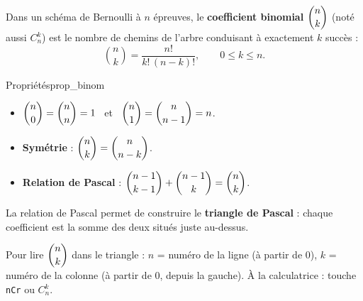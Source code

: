\begin{definition}
	Dans un schéma de Bernoulli à $n$ épreuves, le \textbf{coefficient
	binomial} $\dbinom{n}{k}$ (noté aussi $C_n^k$) est le nombre de chemins de
	l'arbre conduisant à exactement $k$ succès :
	\[
	\binom{n}{k} = \frac{n!}{k!\,(n-k)!}, \qquad 0\leqslant k\leqslant n.
	\]
\end{definition}

\begin{propriete}{Propriétés}{prop_binom}
	\begin{itemize}[label=\textbullet]
		\item $\dbinom{n}{0} = \dbinom{n}{n} = 1$ \ et \
		$\dbinom{n}{1} = \dbinom{n}{n-1} = n$.
		\item \textbf{Symétrie} : $\dbinom{n}{k} = \dbinom{n}{n-k}$.
		\item \textbf{Relation de Pascal} :
		$\dbinom{n-1}{k-1} + \dbinom{n-1}{k} = \dbinom{n}{k}$.
	\end{itemize}
\end{propriete}

La relation de Pascal permet de construire le \textbf{triangle de Pascal} :
chaque coefficient est la somme des deux situés juste au-dessus.

\begin{center}
\end{center}

\begin{astucebac}
	Pour lire $\dbinom{n}{k}$ dans le triangle : $n$ = numéro de la ligne
	(à partir de $0$), $k$ = numéro de la colonne (à partir de $0$, depuis la
	gauche). À la calculatrice : touche \texttt{nCr} ou $C_n^k$.
\end{astucebac}


